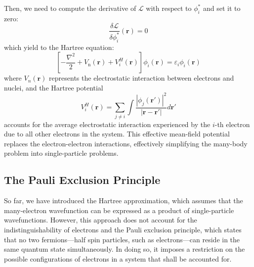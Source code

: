 Then, we need to compute the derivative of $\mathcal{L}$ with respect to $\phi_i^*$ and set it to zero:
\begin{equation}
  \label{eq26}
  \frac{\delta \mathcal{L}}{\delta \phi_i^*}(\mathbf{r}) = 0
\end{equation}
which yield to the Hartree equation:
\begin{equation}
  \label{eq27}
  \left[-\frac{\nabla^2}{2} + V_{\text{n}}(\mathbf{r}) + V^H_i(\mathbf{r})\right]\phi_i(\mathbf{r})  = \varepsilon_i \phi_i(\mathbf{r})
\end{equation}
where $V_n(\mathbf{r})$ represents the electrostatic interaction between electrons and nuclei, and the Hartree potential 
\begin{equation}
  \label{eq28}
  V^H_i(\mathbf{r}) = \sum_{j\neq i} \int \frac{|\phi_j(\mathbf{r'})|^2}{|\mathbf{r} - \mathbf{r'}|} d\mathbf{r'}
\end{equation}
accounts for the average electrostatic interaction experienced by the $i$-th electron due to all other electrons in the system. This effective mean-field potential replaces the electron-electron interactions, effectively simplifying the many-body problem into single-particle problems. 
\subsection{The Pauli Exclusion Principle}
So far, we have introduced the Hartree approximation, which assumes that the many-electron wavefunction can be expressed as a product of single-particle wavefunctions. However, this approach does not account for the indistinguishability of electrons and the Pauli exclusion principle, which states that no two fermions---half spin particles, such as electrons---can reside in the same quantum state simultaneously. In doing so, it imposes a restriction on the possible configurations of electrons in a system that shall be accounted for.
 
